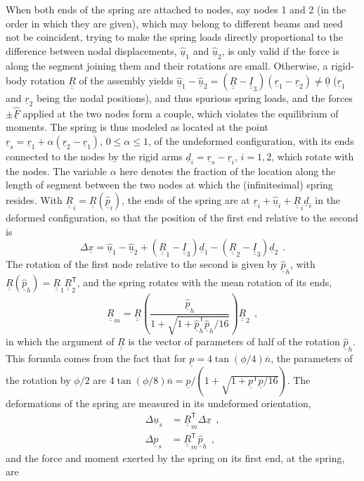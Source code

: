 \documentclass[12pt,a4paper,oneside,english]{abntex2} %
\newcommand{\fix}[1]{{\color{red}#1}}
\newcommand{\vect}[1]{\underline{#1}}
\newcommand{\uvec}[1]{\overline{#1}}
\def\tens#1{\underline{\underline{#1}}}
\def\lp{\left(}
\def\rp{\right)}
\def\T{\mathsf{T}}
\def\Ithree{\tens{I}_3}
\def\R{\tens{R}}
\def\r{\vect{r}}
\def\u{\vect{u}}
\def\uhat{\widehat{\u}}
\def\p{\vect{p}}
\def\phat{\widehat{\p}}
\def\F{\vect{F}}
\def\Fhat{\widehat{\F}}
\def\zv{\vect{0}}
\begin{document}
\begin{apendicesenv}
\fix{When both ends of the spring are attached to nodes, say nodes 1 and 2 (in the order in which they are given), which may belong to different beams and need not be coincident, trying to make the spring loads directly proportional to the difference between nodal displacements, $\uhat_1$ and $\uhat_2$, is only valid if the force is along the segment joining them and their rotations are small. Otherwise, a rigid-body rotation $\R$ of the assembly yields $\uhat_1-\uhat_2=\lp\R-\Ithree\rp\lp\r_1-\r_2\rp\neq\zv$ ($\r_1$ and $\r_2$ being the nodal positions), and thus spurious spring loads, and the forces $\pm\Fhat$ applied at the two nodes form a couple, which violates the equilibrium of moments. The spring is thus modeled as located at the point $\r_s=\r_1+\alpha\lp\r_2-\r_1\rp$, $0\le\alpha\le1$, of the undeformed configuration, with its ends connected to the nodes by the rigid arms $\vect{d}_i=\r_s-\r_i$, $i=1,2$, which rotate with the nodes. The variable $\alpha$ here denotes the fraction of the location along the length of segment between the two nodes at which the (infinitesimal) spring resides. With $\R_i=\R\lp\phat_i\rp$, the ends of the spring are at $\r_i+\uhat_i+\R_i\vect{d}_i$ in the deformed configuration, so that the position of the first end relative to the second is
\begin{equation}
    \Delta\vect{x} = \uhat_1-\uhat_2+\lp\R_1-\Ithree\rp\vect{d}_1-\lp\R_2-\Ithree\rp\vect{d}_2 \ \ . \label{eq:Deltax_spring}
\end{equation}
The rotation of the first node relative to the second is given by $\phat_h$, with $\R\lp\phat_h\rp=\R_1\R_2^\T$, and the spring rotates with the mean rotation of its ends,
\begin{equation}
    \R_m = \R\lp\frac{\phat_h}{1+\sqrt{1+\phat_h^\T\phat_h/16}}\rp\R_2 \ \ , \label{eq:Rm_spring}
\end{equation}
in which the argument of $\R$ is the vector of parameters of half of the rotation $\phat_h$. This formula comes from the fact that for $\p=4\tan\lp\phi/4\rp\uvec{n}$, the parameters of the rotation by $\phi/2$ are $4\tan\lp\phi/8\rp\uvec{n}=\p/\lp1+\sqrt{1+\p^\T\p/16}\rp$. The deformations of the spring are measured in its undeformed orientation,
\begin{align}
    \Delta\u_s &= \R_m^\T\Delta\vect{x} \ \ , \label{eq:deltau_spring}
    \\
    \Delta\p_s &= \R_m^\T\phat_h \ \ , \label{eq:deltap_spring}
\end{align}
and the force and moment exerted by the spring on its first end, at the spring, are
}
\end{apendicesenv}
\end{document}

